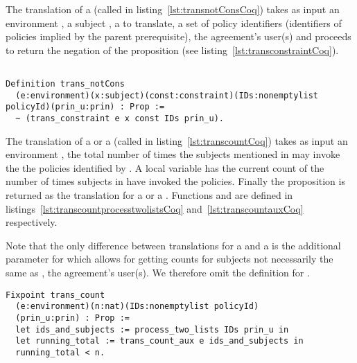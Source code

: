 The translation of a  (called  in listing~\ref{lst:transnotConsCoq}) takes as input 
an environment , a subject , a   to translate, a set of policy identifiers  (identifiers of policies implied by the parent prerequisite), the agreement's user(s)  and proceeds to return the negation of the proposition  (see listing~\ref{lst:transconstraintCoq}).

\begin{lstlisting}

Definition trans_notCons
  (e:environment)(x:subject)(const:constraint)(IDs:nonemptylist policyId)(prin_u:prin) : Prop :=
  ~ (trans_constraint e x const IDs prin_u).
\end{lstlisting}


The translation of a  or a  (called  in listing~\ref{lst:transcountCoq}) takes as input an environment ,  the total number of times the subjects mentioned in  may invoke the 
the policies identified by .
A local variable  has the current count of the number of times subjects in  have invoked the policies. Finally the proposition  is returned as the translation for a  or a . Functions  and  are defined in listings~\ref{lst:transcountprocesstwolistsCoq} and~\ref{lst:transcountauxCoq} respectively.

Note that the only difference between translations for a  and a  is the additional  parameter for  which allows for getting counts for subjects not necessarily the same as , the agreement's user(s). We therefore omit the definition for .


\begin{minipage}[c]{0.95\textwidth}
\begin{lstlisting}
Fixpoint trans_count
  (e:environment)(n:nat)(IDs:nonemptylist policyId)
  (prin_u:prin) : Prop :=
  let ids_and_subjects := process_two_lists IDs prin_u in
  let running_total := trans_count_aux e ids_and_subjects in
  running_total < n.
\end{lstlisting}
\end{minipage}


